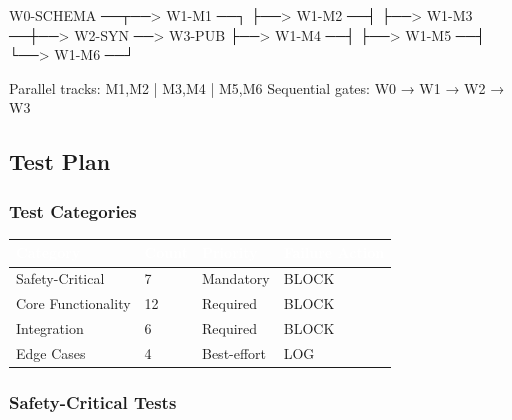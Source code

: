 \documentclass[11pt,letterpaper]{article}
\newcommand{\tableheader}[1]{\textbf{\sffamily\textcolor{white}{#1}}}
\begin{document}
\begin{asciibox}
W0-SCHEMA ──┬──> W1-M1 ──┐
            ├──> W1-M2 ──┤
            ├──> W1-M3 ──┼──> W2-SYN ──> W3-PUB
            ├──> W1-M4 ──┤
            ├──> W1-M5 ──┤
            └──> W1-M6 ──┘

Parallel tracks: {M1,M2} | {M3,M4} | {M5,M6}
Sequential gates: W0 → W1 → W2 → W3
\end{asciibox}

\subsection{Test Plan}

\subsubsection{Test Categories}

\begin{center}
\begin{tabularx}{\textwidth}{L{3cm}C{1.5cm}C{2cm}C{2cm}}
\toprule
{}
\tableheader{Category} & \tableheader{Count} & \tableheader{Priority} & \tableheader{Failure Action} \\
\midrule
Safety-Critical & 7 & Mandatory & BLOCK \\
Core Functionality & 12 & Required & BLOCK \\
Integration & 6 & Required & BLOCK \\
Edge Cases & 4 & Best-effort & LOG \\
\bottomrule
\end{tabularx}
\end{center}

\subsubsection{Safety-Critical Tests}
\end{document}

